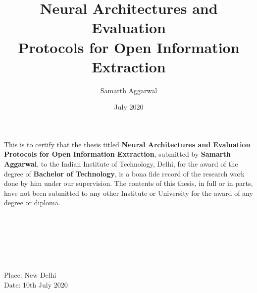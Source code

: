 \documentclass[BTech]{iitddiss}
\begin{document}

\title{Neural Architectures and Evaluation \\Protocols for Open Information Extraction}

\author{Samarth Aggarwal}
\date{July 2020}

\maketitle

\certificate

\vspace*{0.5in}

\noindent This is to certify that the thesis titled {\bf Neural Architectures and Evaluation Protocols for Open Information Extraction}, submitted by {\bf Samarth Aggarwal},
  to the Indian Institute of Technology, Delhi, for
the award of the degree of {\bf Bachelor of Technology}, is a bona fide
record of the research work done by him under our supervision.  The
contents of this thesis, in full or in parts, have not been submitted
to any other Institute or University for the award of any degree or
diploma.

\vspace*{1.5in}

\begin{singlespacing}
\hspace*{-0.25in}
\parbox{6.4in}{
 \\
 \\
\\
\\
}
\hspace*{1.0in}
\end{singlespacing}
\vspace*{0.25in}\\
\noindent Place: New Delhi\\
Date: 10th July 2020


\acknowledgements
\end{document}
